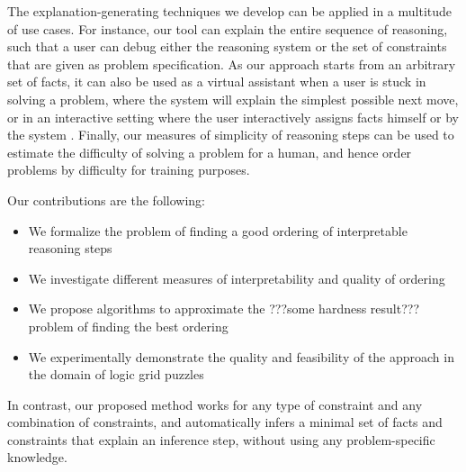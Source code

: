 The explanation-generating techniques we develop can be applied in a multitude of use cases. 
For instance, our tool can explain the entire sequence of reasoning, such that a user can debug either the reasoning system or the set of constraints that are given as problem specification. 
As our approach starts from an arbitrary set of facts, it can also be used as a virtual assistant when a user is stuck in solving a problem, where the system will explain the simplest possible next move, or in an interactive setting where the user interactively assigns facts himself or by the system . 
Finally, our measures of simplicity of reasoning steps can be used to estimate the difficulty of solving a problem for a human, and hence order problems by difficulty for training purposes.


Our contributions are the following:
\begin{itemize}
	\item We formalize the problem of finding a good ordering of interpretable reasoning steps
	\item We investigate different measures of interpretability and quality of ordering
	\item We propose algorithms to approximate the ???some hardness result??? problem of finding the best ordering  
	\item We experimentally demonstrate the quality and feasibility of the approach in the domain of logic grid puzzles
\end{itemize}

In contrast, our proposed method works for any type of constraint and any combination of constraints, and automatically infers a minimal set of facts and constraints that explain an inference step, without using any problem-specific knowledge.

